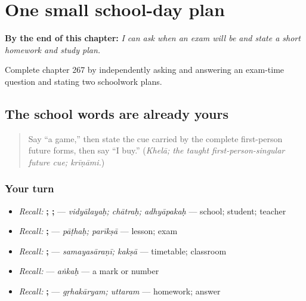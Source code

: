 
\chapter{One small school-day plan}
\label{ch:sa-school-day-plan}

\begin{chapteropening}
\textbf{By the end of this chapter:} \emph{I can ask when an exam will be and state a short homework and study plan.}

Complete chapter 267 by independently asking and answering an exam-time question and stating two schoolwork plans.
\end{chapteropening}

\section[(school-word recall)]{The school words are already yours}

\label{lesson:SA-C267-school-recall}



\begin{quote}
Say “a game,” then state the cue carried by the complete first-person future forms, then say “I buy.” (\emph{Khelā; the taught first-person-singular future cue; krīṇāmi.})
\end{quote}

\subsection*{Your turn}
\begin{itemize}
\raggedright
  \item \emph{Recall:} \textbf{; ; } — \emph{vidyālayaḥ; chātraḥ; adhyāpakaḥ} — school; student; teacher
  \item \emph{Recall:} \textbf{; } — \emph{pāṭhaḥ; parīkṣā} — lesson; exam
  \item \emph{Recall:} \textbf{; } — \emph{samayasāraṇī; kakṣā} — timetable; classroom
  \item \emph{Recall:} \textbf{} — \emph{aṅkaḥ} — a mark or number
  \item \emph{Recall:} \textbf{; } — \emph{gṛhakāryam; uttaram} — homework; answer
\end{itemize}


